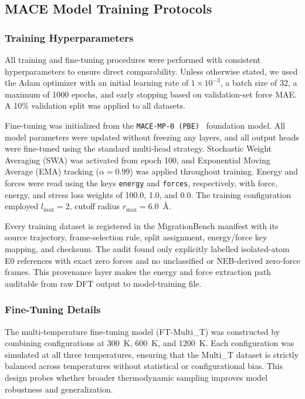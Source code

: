 \documentclass[pdflatex,sn-mathphys-num]{sn-jnl}%
\providecommand{\reviewermap}[3]{}
\theoremstyle{thmstyleone}%
\theoremstyle{thmstyletwo}%
\theoremstyle{thmstylethree}%
\begin{document}
\subsection{MACE Model Training Protocols}

\subsubsection{Training Hyperparameters}
All training and fine-tuning procedures were performed with consistent hyperparameters to ensure direct comparability. Unless otherwise stated, we used the Adam optimizer with an initial learning rate of $1\times10^{-3}$, a batch size of 32, a maximum of 1000 epochs, and early stopping based on validation-set force MAE. A 10\% validation split was applied to all datasets.

Fine-tuning was initialized from the \texttt{MACE-MP-0 (PBE)}~\cite{batatia_mace_nodate} foundation model. All model parameters were updated without freezing any layers, and all output heads were fine-tuned using the standard multi-head strategy. Stochastic Weight Averaging (SWA) was activated from epoch 100, and Exponential Moving Average (EMA) tracking ($\alpha=0.99$) was applied throughout training. Energy and forces were read using the keys \texttt{energy} and \texttt{forces}, respectively, with force, energy, and stress loss weights of 100.0, 1.0, and 0.0. The training configuration employed $l_{\max}=2$, cutoff radius $r_{\max}=6.0$~Å.
\reviewermap{REV-C8}{done-local}{The release includes the fail-closed frame-level force audit, source-file checksums, and the training provenance specification.}
Every training dataset is registered in the MigrationBench manifest with its source trajectory, frame-selection rule, split assignment, energy/force key mapping, and checksum. The audit found only explicitly labelled isolated-atom E0 references with exact zero forces and no unclassified or NEB-derived zero-force frames. This provenance layer makes the energy and force extraction path auditable from raw DFT output to model-training file.


\subsubsection{Fine-Tuning Details}
The multi-temperature fine-tuning model (FT-Multi\_T) was constructed by combining configurations at 300~K, 600~K, and 1200~K. Each configuration was simulated at all three temperatures, ensuring that the Multi\_T dataset is strictly balanced across temperatures without statistical or configurational bias. This design probes whether broader thermodynamic sampling improves model robustness and generalization.
\end{document}

